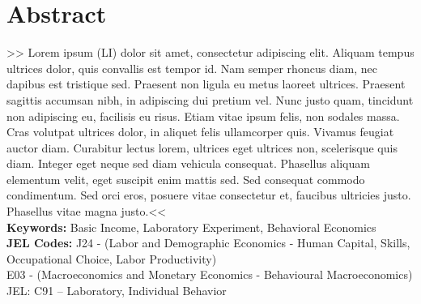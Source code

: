 \chapter*{Abstract}

>> Lorem ipsum (LI) dolor sit amet, consectetur adipiscing elit. Aliquam tempus ultrices dolor, quis convallis est tempor id. Nam semper rhoncus diam, nec dapibus est tristique sed. Praesent non ligula eu metus laoreet ultrices. Praesent sagittis accumsan nibh, in adipiscing dui pretium vel. Nunc justo quam, tincidunt non adipiscing eu, facilisis eu risus. Etiam vitae ipsum felis, non sodales massa. Cras volutpat ultrices dolor, in aliquet felis ullamcorper quis. Vivamus feugiat auctor diam. Curabitur lectus lorem, ultrices eget ultrices non, scelerisque quis diam. Integer eget neque sed diam vehicula consequat. Phasellus aliquam elementum velit, eget suscipit enim mattis sed. Sed consequat commodo condimentum. Sed orci eros, posuere vitae consectetur et, faucibus ultricies justo. Phasellus vitae magna justo.<<\\

\textbf{Keywords:} Basic Income, Laboratory Experiment, Behavioral Economics\\

\textbf{JEL Codes:} J24 - (Labor and Demographic Economics - Human Capital, Skills, Occupational Choice, Labor Productivity)\\
E03 - (Macroeconomics and Monetary Economics - Behavioural Macroeconomics)\\
JEL: C91 – Laboratory, Individual Behavior\\